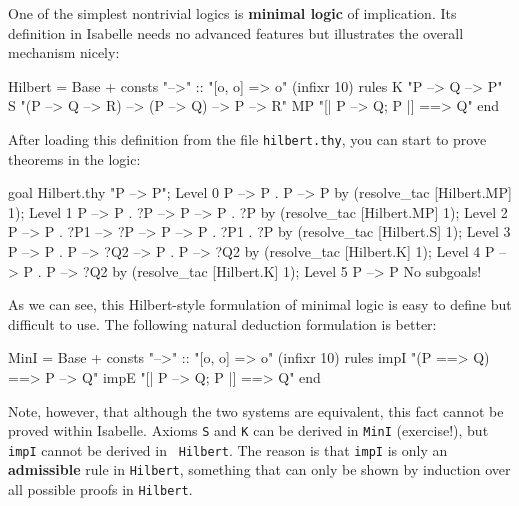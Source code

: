 One of the simplest nontrivial logics is {\bf minimal logic} of
implication.  Its definition in Isabelle needs no advanced features but
illustrates the overall mechanism nicely:
\begin{ttbox}
Hilbert = Base +
consts
  "-->" :: "[o, o] => o"   (infixr 10)
rules
  K     "P --> Q --> P"
  S     "(P --> Q --> R) --> (P --> Q) --> P --> R"
  MP    "[| P --> Q; P |] ==> Q"
end
\end{ttbox}
After loading this definition from the file {\tt hilbert.thy}, you can
start to prove theorems in the logic:
\begin{ttbox}
goal Hilbert.thy "P --> P";
{\out Level 0}
{\out P --> P}
{.  P --> P}
\ttbreak
by (resolve_tac [Hilbert.MP] 1);
{\out Level 1}
{\out P --> P}
{.  ?P --> P --> P}
{.  ?P}
\ttbreak
by (resolve_tac [Hilbert.MP] 1);
{\out Level 2}
{\out P --> P}
{.  ?P1 --> ?P --> P --> P}
{.  ?P1}
{.  ?P}
\ttbreak
by (resolve_tac [Hilbert.S] 1);
{\out Level 3}
{\out P --> P}
{.  P --> ?Q2 --> P}
{.  P --> ?Q2}
\ttbreak
by (resolve_tac [Hilbert.K] 1);
{\out Level 4}
{\out P --> P}
{.  P --> ?Q2}
\ttbreak
by (resolve_tac [Hilbert.K] 1);
{\out Level 5}
{\out P --> P}
{\out No subgoals!}
\end{ttbox}
As we can see, this Hilbert-style formulation of minimal logic is easy to
define but difficult to use.  The following natural deduction formulation is
better:
\begin{ttbox}
MinI = Base +
consts
  "-->" :: "[o, o] => o"   (infixr 10)
rules
  impI  "(P ==> Q) ==> P --> Q"
  impE  "[| P --> Q; P |] ==> Q"
end
\end{ttbox}
Note, however, that although the two systems are equivalent, this fact
cannot be proved within Isabelle.  Axioms {\tt S} and {\tt K} can be
derived in {\tt MinI} (exercise!), but {\tt impI} cannot be derived in {\tt
  Hilbert}.  The reason is that {\tt impI} is only an {\bf admissible} rule
in {\tt Hilbert}, something that can only be shown by induction over all
possible proofs in {\tt Hilbert}.

